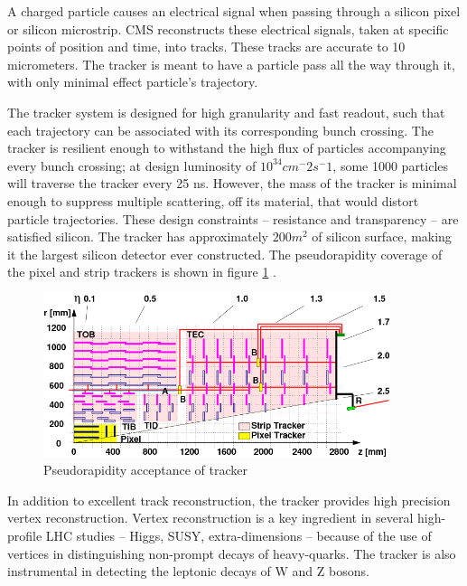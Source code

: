 A charged particle causes an electrical signal when passing through a silicon pixel or silicon microstrip. CMS reconstructs these electrical signals, taken at specific points of position and time, into tracks. These tracks are accurate to 10 micrometers. The tracker is meant to have  a particle pass all the way through it, with only minimal effect particle's trajectory. 

The tracker system is designed for high granularity and fast readout, such that each trajectory can be associated with its corresponding bunch crossing. The tracker is resilient enough to withstand the high flux of particles accompanying every bunch crossing; at design luminosity of $10^34 cm^-2 s^-1$, some 1000 particles will traverse the tracker every 25 ns. However, the mass of the tracker is minimal enough to suppress multiple scattering, off its material, that would distort particle trajectories. These design constraints -- resistance and transparency -- are satisfied silicon. The tracker has approximately $200 m^2$ of silicon surface, making it the largest silicon detector ever constructed. The pseudorapidity coverage of the pixel and strip trackers is shown in figure \ref{fig:trackerYZ} \cite{Chatrchyan:2009sr}.

\begin{figure}[]
\begin{centering}
\includegraphics[width=4in]{Chapter3/importfigs/cms_cft_09_003_fig1.png}
\par\end{centering}
\caption{Pseudorapidity acceptance of tracker \cite{Chatrchyan:2009sr} \label{fig:trackerYZ}}
\end{figure}

In addition to excellent track reconstruction, the tracker provides high precision vertex reconstruction. Vertex reconstruction is a key ingredient in several high-profile LHC studies -- Higgs, SUSY, extra-dimensions -- because of the use of vertices in distinguishing non-prompt decays of heavy-quarks. The tracker is also instrumental in detecting the leptonic decays of W and Z bosons. 

